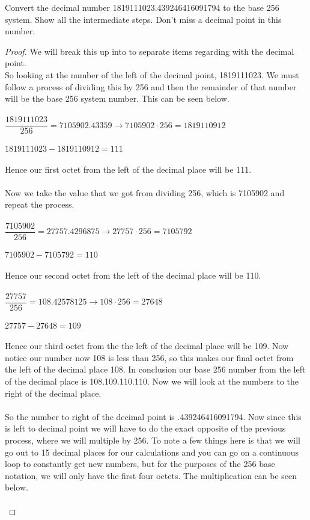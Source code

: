 \documentclass[12pt]{article}
\newenvironment{exercise}[2][Exercise]{\begin{trivlist}
\item[\hskip \labelsep {\bfseries #1}\hskip \labelsep {\bfseries #2.}]}{\end{trivlist}}
\begin{document}
\begin{exercise}{9}
Convert the decimal number 1819111023.439246416091794 to the base 256 system. Show all the intermediate steps. Don't miss a decimal point in this number. 
\end{exercise}

\begin{proof}
We will break this up into to separate items regarding with the decimal point. 
\\
So looking at the number of the left of the decimal point, 1819111023. We must follow a process of dividing this by 256 and then the remainder of that number will be the base 256 system number. This can be seen below. \\ \\
$\dfrac{1819111023}{256} = 7105902.43359 \rightarrow 7105902 \cdot 256 = 1819110912$ \\ \\
$1819111023 - 1819110912 = 111$ \\ \\
Hence our first octet from the left of the decimal place will be 111. \\ \\ 
Now we take the value that we got from dividing 256, which is 7105902 and repeat the process. \\ \\
$\dfrac{7105902}{256} = 27757.4296875 \rightarrow 27757 \cdot 256 = 7105792$ \\ \\ 
$7105902 - 7105792 = 110$ \\ \\
Hence our second octet from the left of the decimal place will be 110. \\ \\ 
$\dfrac{27757}{256} = 108.42578125 \rightarrow 108 \cdot 256 = 27648$ \\ \\
$27757 - 27648 = 109$ \\ \\
Hence our third octet from the the left of the decimal place will be 109. Now notice our number now 108 is less than 256, so this makes our final octet from the left of the decimal place 108. In conclusion our base 256 number from the left of the decimal place is 108.109.110.110. Now we will look at the numbers to the right of the decimal place. \\ \\ 
So the number to right of the decimal point is .439246416091794. Now since this is left to decimal point we will have to do the exact opposite of the previous process, where we will multiple by 256. To note a few things here is that we will go out to 15 decimal places for our calculations and you can go on a continuous loop to constantly get new numbers, but for the purposes of the 256 base notation, we will only have the first four octets. The multiplication can be seen below. \\ \\

\end{proof}
\end{document}
